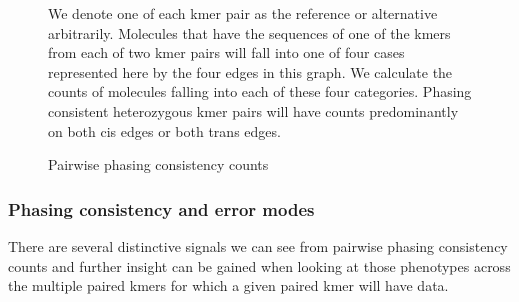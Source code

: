 \begin{figure}[htbp!]
\caption{Pairwise phasing consistency counts}\label{figure:consistency}
\centering
{}
\par{
We denote one of each kmer pair as the reference or alternative arbitrarily. Molecules that have the sequences of one of the kmers from each of two kmer pairs will fall into one of four cases represented here by the four edges in this graph. We calculate the counts of molecules falling into each of these four categories. Phasing consistent heterozygous kmer pairs will have counts predominantly on both cis edges or both trans edges.
}
\end{figure}

\subsubsection{Phasing consistency and error modes}

\par{
There are several distinctive signals we can see from pairwise phasing consistency counts and further insight can be gained when looking at those phenotypes across the multiple paired kmers for which a given paired kmer will have data.
}

